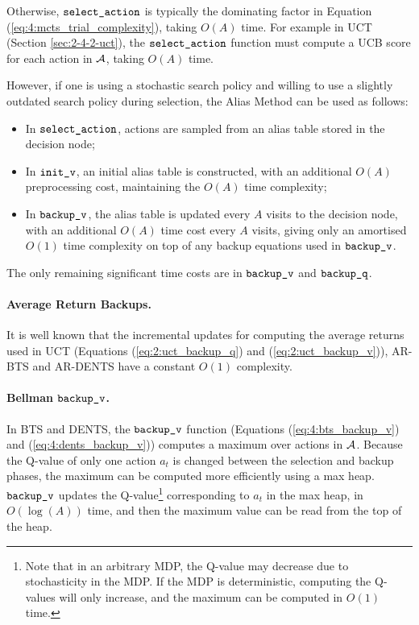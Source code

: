     Otherwise, ${\textnormal{\texttt{select\_action}}}$ is typically the dominating factor in Equation (\ref{eq:4:mcts_trial_complexity}), taking $O(A)$ time. For example in UCT (Section \ref{sec:2-4-2-uct}), the ${\textnormal{\texttt{select\_action}}}$ function must compute a UCB score for each action in $\mathcal{A}$, taking $O(A)$ time.

    However, if one is using a stochastic search policy and willing to use a slightly outdated search policy during selection, the Alias Method can be used as follows:
    \begin{itemize}
        \item In ${\textnormal{\texttt{select\_action}}}$, actions are sampled from an alias table stored in the decision node;
        \item In ${\textnormal{\texttt{init\_v}}}$, an initial alias table is constructed, with an additional $O(A)$ preprocessing cost, maintaining the $O(A)$ time complexity;
        \item In ${\textnormal{\texttt{backup\_v}}}$, the alias table is updated every $A$ visits to the decision node, with an additional $O(A)$ time cost every $A$ visits, giving only an amortised $O(1)$ time complexity on top of any backup equations used in ${\textnormal{\texttt{backup\_v}}}$.
    \end{itemize}

    The only remaining significant time costs are in ${\textnormal{\texttt{backup\_v}}}$ and ${\textnormal{\texttt{backup\_q}}}$. 

    \paragraph{Average Return Backups.}
    
    It is well known that the incremental updates for computing the average returns used in UCT (Equations (\ref{eq:2:uct_backup_q}) and (\ref{eq:2:uct_backup_v})), AR-BTS and AR-DENTS have a constant $O(1)$ complexity.

    \paragraph{Bellman ${\textnormal{\texttt{backup\_v}}}$.}

    In BTS and DENTS, the ${\textnormal{\texttt{backup\_v}}}$ function (Equations (\ref{eq:4:bts_backup_v}) and (\ref{eq:4:dents_backup_v})) computes a maximum over actions in $\mathcal{A}$. Because the Q-value of only one action $a_t$ is changed between the selection and backup phases, the maximum can be computed more efficiently using a max heap. ${\textnormal{\texttt{backup\_v}}}$ updates the Q-value\footnote{Note that in an arbitrary MDP, the Q-value may decrease due to stochasticity in the MDP. If the MDP is deterministic, computing the Q-values will only increase, and the maximum can be computed in $O(1)$ time.} corresponding to $a_t$ in the max heap, in $O(\log(A))$ time, and then the maximum value can be read from the top of the heap.
    
